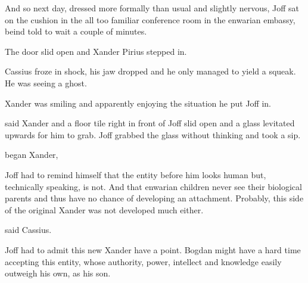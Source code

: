 And so next day, dressed more formally than usual and slightly nervous, Joff sat on the cushion in the all too familiar conference room in the enwarian embassy, beind told to wait a couple of minutes.

The door slid open and Xander Pirius stepped in.


Cassius froze in shock, his jaw dropped and he only managed to yield a squeak. He was seeing a ghost.

 Xander was smiling and apparently enjoying the situation he put Joff in.

 said Xander and a floor tile right in front of Joff slid open and a glass levitated upwards for him to grab. Joff grabbed the glass without thinking and took a sip.


 began Xander, 







Joff had to remind himself that the entity before him looks human but, technically speaking, is not. And that enwarian children never see their biological parents and thus have no chance of developing an attachment. Probably, this side of the original Xander was not developed much either.

 said Cassius.


Joff had to admit this new Xander have a point. Bogdan might have a hard time accepting this entity, whose authority, power, intellect and knowledge easily outweigh his own, as his son. %

